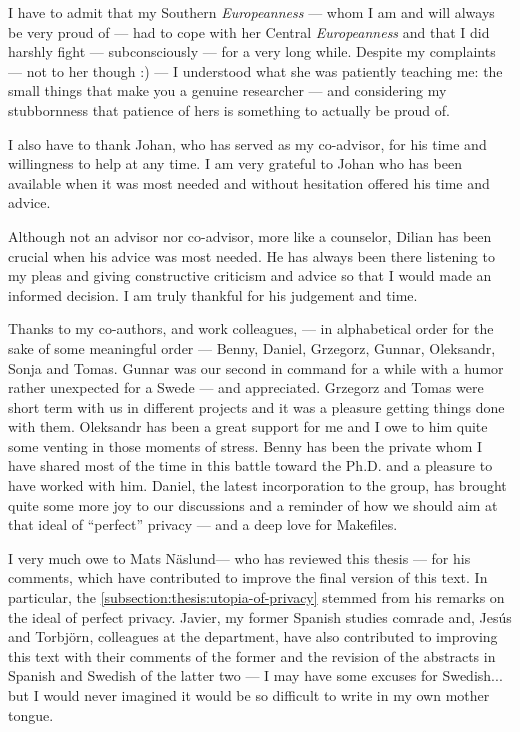 I have to admit that my Southern \emph{Europeanness} --- whom I am and will always 
be very proud of --- had to cope with her Central \emph{Europeanness} and that I 
did harshly fight --- subconsciously --- for a very long while. Despite my complaints 
--- not to her though :) --- I understood what she was patiently teaching me: the 
small things that make you a genuine researcher --- and considering my stubbornness 
that patience of hers is something to actually be proud of.

I also have to thank Johan, who has served as my co-advisor, for his time and willingness 
to help at any time. I am very grateful to Johan who has been available when it 
was most needed and without hesitation offered his time and advice. 

Although not an advisor nor co-advisor, more like a counselor, Dilian has been crucial 
when his advice was most needed. He has always been there listening to my pleas 
and giving constructive criticism and advice so that I would made an informed decision. 
I am truly thankful for his judgement and time.

Thanks to my co-authors, and work colleagues, --- in alphabetical order for the 
sake of some meaningful order --- Benny, Daniel, Grzegorz, Gunnar, Oleksandr, Sonja 
and Tomas. Gunnar was our second in command for a while with a humor rather unexpected 
for a Swede --- and appreciated. Grzegorz and Tomas were short term with us in different 
projects and it was a pleasure getting things done with them. Oleksandr has been 
a great support for me and I owe to him quite some venting in those moments of stress. 
Benny has been the private whom I have shared most of the time in this battle toward 
the Ph.D. and a pleasure to have worked with him. Daniel, the latest incorporation 
to the group, has brought quite some more joy to our discussions and a reminder 
of how we should aim at that ideal of ``perfect'' privacy --- and a deep love for 
Makefiles.

I very much owe to Mats N\"{a}slund--- who has reviewed this thesis --- for his 
comments, which have contributed to improve the final version of this text. In particular, 
the \cref{subsection:thesis:utopia-of-privacy} stemmed from his remarks on the ideal 
of perfect privacy. Javier, my former Spanish studies comrade and, Jes\'{u}s and 
Torbj\"{o}rn, colleagues at the department, have also contributed to improving this 
text with their comments of the former and the revision of the abstracts in Spanish 
and Swedish of the latter two --- I may have some excuses for Swedish... but I would 
never imagined it would be so difficult to write in my own mother tongue. 

